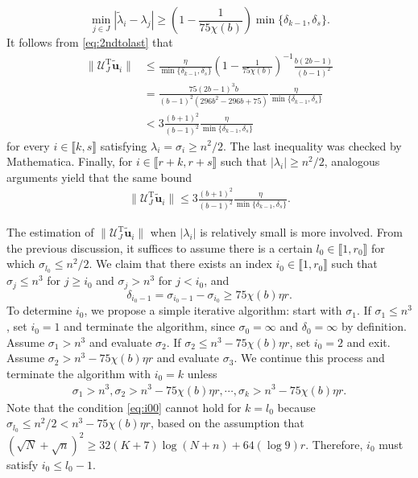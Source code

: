 \documentclass[reqno]{amsart}
\newcommand{\T}{\mathrm{T}}
\theoremstyle{plain}
\theoremstyle{definition}
\begin{document}
$$\min_{j\in J} |\widetilde \lambda_i - \lambda_j|  \ge \left(1-\frac{1}{75\chi(b)}\right) \min\{ \delta_{k-1},\delta_s \}.$$ 
It follows from \eqref{eq:2ndtolast} that
\begin{align}\label{eq:UJbd3}
 \|\mathcal U_J^\T \widetilde{\mathbf u}_i\| &\le \frac{\eta}{ \min\{\delta_{k-1},\delta_s\} }\left(1-\frac{1}{75\chi(b)}\right)^{-1}\frac{b(2b-1)}{(b-1)^2}\nonumber\\
 &=\frac{75(2b-1)^3b}{(b-1)^2(296b^2-296 b+75)}\frac{\eta}{ \min\{\delta_{k-1},\delta_s\} } \nonumber\\
 &< 3 \frac{(b+1)^2}{(b-1)^2}\frac{\eta}{\min\{\delta_{k-1},\delta_s\}} 
\end{align} 
for every $i \in \llbracket k, s\rrbracket$ satisfying $\lambda_i=\sigma_i \ge n^2/2$. The last inequality was checked by Mathematica. Finally, for $i \in \llbracket r+k, r+s\rrbracket$ such that $|\lambda_i| \ge n^2/2$, analogous arguments yield that the same bound
\begin{align}\label{eq:UJbd4}
\| {\mathcal U}_J^\T \widetilde{\mathbf u}_i \| %
\le 3 \frac{(b+1)^2}{(b-1)^2}\frac{\eta}{\min\{\delta_{k-1},\delta_s\}}.
\end{align}

\medskip

The estimation of $\| \mathcal U_J^\T \widetilde{\mathbf u}_i \|$ when $| \lambda_i|$ is relatively small is more involved. From the previous discussion, it suffices to assume there is a certain $l_0 \in \llbracket 1, r_0\rrbracket$ for which $\sigma_{l_0} \le n^2/2$. We claim that there exists an index $i_0\in \llbracket 1, r_0\rrbracket$ such that $\sigma_j \le  n^3$ for $j\ge i_0$ and $\sigma_j> n^3$ for $j < i_0$, and 
$$\delta_{i_0-1} =\sigma_{i_0-1}- \sigma_{i_0}\ge 75 \chi(b) \eta r.$$
To determine $i_0$, we propose a simple iterative algorithm: start with $\sigma_1$. If $\sigma_1\le n^3$, set $i_0=1$ and terminate the algorithm, since $\sigma_0=\infty$ and $\delta_0=\infty$ by definition. Assume $\sigma_1> n^3$ and evaluate $\sigma_2$. If $\sigma_2 \le n^3 - 75 \chi(b) \eta r$,  set $i_0=2$ and exit. Assume $\sigma_2 > n^3 - 75 \chi(b) \eta r$ and evaluate $\sigma_3$. We continue this process and terminate the algorithm with $i_0=k $ unless 
\begin{align}\label{eq:i00}
\sigma_1> n^3, \sigma_2 > n^3 - 75 \chi(b) \eta r, \cdots, \sigma_k > n^3 - 75 \chi(b) \eta r.
\end{align}
Note that the condition \eqref{eq:i00} cannot hold for $k=l_0$ because $\sigma_{l_0} \le n^2/2 < n^3 - 75 \chi(b) \eta r$, based on the assumption that $(\sqrt N + \sqrt n)^2 \ge 32(K+7)\log(N+n) + 64(\log 9) r$. Therefore, $i_0$ must satisfy $i_0 \le l_0 - 1$.
\end{document}
